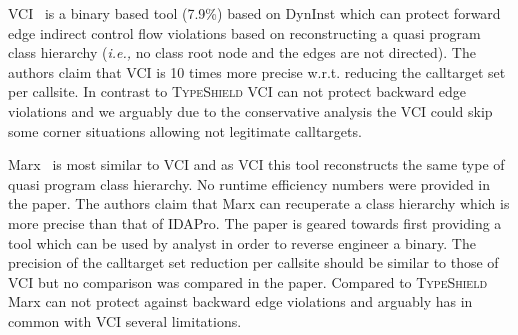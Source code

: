VCI~\cite{vci:asiaccs} is a binary based tool (7.9\%) based on DynInst which can protect forward edge indirect control flow violations based 
on reconstructing a quasi program class hierarchy (\textit{i.e.,} no class root node and the edges are not directed). The authors claim that 
VCI is 10 times more precise w.r.t. reducing the calltarget set per callsite. In contrast to \textsc{TypeShield} VCI can not 
protect backward edge violations and we arguably due to the conservative analysis the VCI could skip some corner situations 
allowing not legitimate calltargets.

Marx~\cite{marx} is most similar to VCI and as VCI this tool reconstructs the same type of quasi program class hierarchy. 
No runtime efficiency numbers were provided in the paper.
The authors claim that Marx can recuperate a class hierarchy which is more precise than that of IDAPro. The paper is geared towards
first providing a tool which can be used by analyst in order to reverse engineer a binary. The precision of the calltarget set reduction
per callsite should be similar to those of VCI but no comparison was compared in the paper. Compared to \textsc{TypeShield} 
Marx can not protect against backward edge violations and arguably has in common with VCI several limitations.



